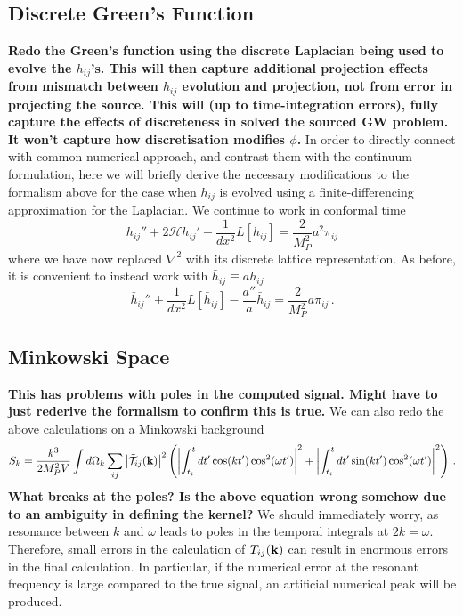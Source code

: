 \documentclass{revtex4}
\begin{document}
\subsection{Discrete Green's Function}
{\bf Redo the Green's function using the discrete Laplacian being used to evolve the $h_{ij}$'s.  This will then capture additional projection effects from mismatch between $h_{ij}$ evolution and projection, not from error in projecting the source.  This will (up to time-integration errors), fully capture the effects of discreteness in solved the sourced GW problem.  It won't capture how discretisation modifies $\phi$.}
In order to directly connect with common numerical approach, and contrast them with the continuum formulation, here we will briefly derive the necessary modifications to the formalism above for the case when $h_{ij}$ is evolved using a finite-differencing approximation for the Laplacian.
We continue to work in conformal time
\begin{equation}
  h_{ij}'' + 2\mathcal{H}h_{ij}' - \frac{1}{dx^2}L[h_{ij}] = \frac{2}{M_P^2}a^2\pi_{ij}
\end{equation}
where we have now replaced $\nabla^2$ with its discrete lattice representation.
As before, it is convenient to instead work with $\bar{h}_{ij} \equiv ah_{ij}$
\begin{equation}
  \bar{h}_{ij}'' + \frac{1}{dx^2}L[\bar{h}_{ij}] - \frac{a''}{a}\bar{h}_{ij} = \frac{2}{M_P^2}a\pi_{ij} \, .
\end{equation}

\subsection{Minkowski Space}
{\bf This has problems with poles in the computed signal.  Might have to just rederive the formalism to confirm this is true.}
We can also redo the above calculations on a Minkowski background
\begin{equation}
  S_k = \frac{k^3}{2M_P^2V}\int d\Omega_k\sum_{ij}\left|\tilde{\mathcal{T}}_{ij}({\bf k})\right|^2 \left(\left|\int_{t_i}^tdt'\cos(kt')\cos^2(\omega t') \right|^2 + \left|\int_{t_i}^tdt'\sin(kt')\cos^2(\omega t') \right|^2 \right) \, .
\end{equation}
{\bf What breaks at the poles?  Is the above equation wrong somehow due to an ambiguity in defining the kernel?}
We should immediately worry, as resonance between $k$ and $\omega$ leads to poles in the temporal integrals at $2k = \omega$.
Therefore, small errors in the calculation of $T_{ij}({\bf k})$ can result in enormous errors in the final calculation.
In particular, if the numerical error at the resonant frequency is large compared to the true signal, an artificial numerical peak will be produced.
\end{document}
